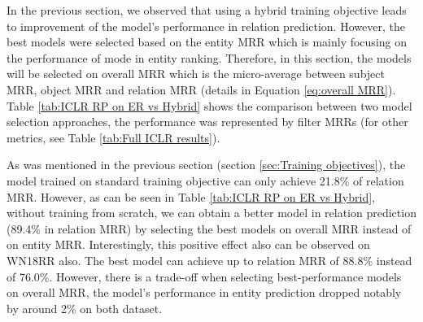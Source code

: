 In the previous section, we observed that using a hybrid training objective leads to improvement of the model's performance in relation prediction. However, the best models were selected based on the entity MRR which is mainly focusing on the performance of mode in entity ranking. Therefore, in this section, the models will be selected on overall MRR which is the micro-average between subject MRR, object MRR and relation MRR (details in Equation \ref{eq:overall MRR}). Table \ref{tab:ICLR RP on ER vs Hybrid} shows the comparison between two model selection approaches, the performance was represented by filter MRRs (for other metrics, see Table \ref{tab:Full ICLR results}). 


\begin{table}[!htbp]
\centering
{}
\caption[Model performance in three training objectives (selected on entity and overall MRRs)]{Model performance in three training objectives. \textit{Selected on entity MRR:} The best models were selected based on models' performance in entity MRR metric. \textit{Selected on overall MRR:} The best models were selected based on models' performance in overall MRR metric.}
\label{tab:ICLR RP on ER vs Hybrid}
\end{table}


As was mentioned in the previous section (section \ref{sec:Training objectives}), the model trained on standard training objective can only achieve 21.8\% of relation MRR. However, as can be seen in Table \ref{tab:ICLR RP on ER vs Hybrid}, without training from scratch, we can obtain a better model in relation prediction (89.4\% in relation MRR) by selecting the best models on overall MRR instead of on entity MRR. Interestingly, this positive effect also can be observed on WN18RR also. The best model can achieve up to relation MRR of 88.8\% instead of 76.0\%. However, there is a trade-off when selecting best-performance models on overall MRR, the model's performance in entity prediction dropped notably by around 2\% on both dataset. 

